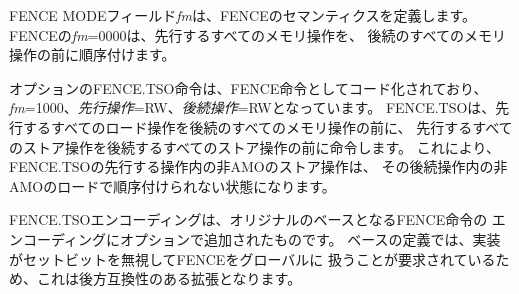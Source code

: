 FENCE MODEフィールド{\em fm}は、FENCEのセマンティクスを定義します。
FENCEの{\em fm}=0000は、先行するすべてのメモリ操作を、
後続のすべてのメモリ操作の前に順序付けます。

\begin{comment}
The optional FENCE.TSO instruction is encoded as a FENCE instruction
with {\em fm}=1000, {\em predecessor}=RW, and {\em successor}=RW.
FENCE.TSO orders all load
operations in its predecessor set before all memory operations in its
successor set, and all store operations in its predecessor set before
all store operations in its successor set.  This leaves non-AMO store
operations in the FENCE.TSO's predecessor set unordered with non-AMO
loads in its successor set.
\end{comment}

オプションのFENCE.TSO命令は、FENCE命令としてコード化されており、
{\em fm}=1000、{\em 先行操作}=RW、{\em 後続操作}=RWとなっています。
FENCE.TSOは、先行するすべてのロード操作を後続のすべてのメモリ操作の前に、
先行するすべてのストア操作を後続するすべてのストア操作の前に命令します。 
これにより、FENCE.TSOの先行する操作内の非AMOのストア操作は、
その後続操作内の非AMOのロードで順序付けられない状態になります。

\begin{commentary}
\begin{comment}
  The FENCE.TSO encoding was added as an optional extension to the
  original base FENCE instruction encoding.  The base definition
  requires that implementations ignore any set bits and treat the
  FENCE as global, and so this is a backwards-compatible extension.
\end{comment}

FENCE.TSOエンコーディングは、オリジナルのベースとなるFENCE命令の
エンコーディングにオプションで追加されたものです。 
ベースの定義では、実装がセットビットを無視してFENCEをグローバルに
扱うことが要求されているため、これは後方互換性のある拡張となります。
\end{commentary}

\begin{comment}
The unused fields in the FENCE instructions---{\em rs1} and {\em rd}---are
reserved for finer-grain fences in future extensions.  For forward
compatibility, base implementations shall ignore these fields, and standard
software shall zero these fields.  Likewise, many {\em fm} and
predecessor/successor set settings in Table~\ref{fm} are also reserved
for future use.  Base implementations shall treat all such reserved
configurations as normal fences with {\em fm}=0000, and standard
software shall use only non-reserved configurations.
\end{comment}

